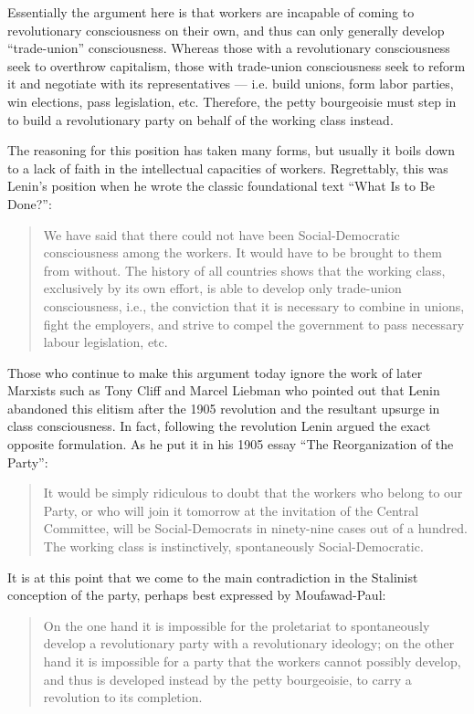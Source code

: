 Essentially the argument here is that workers are incapable of coming to revolutionary consciousness on their own, and thus can only generally develop ``trade-union'' consciousness. Whereas those with a revolutionary consciousness seek to overthrow capitalism, those with trade-union consciousness seek to reform it and negotiate with its representatives --- i.e. build unions, form labor parties, win elections, pass legislation, etc. Therefore, the petty bourgeoisie must step in to build a revolutionary party on behalf of the working class instead.

The reasoning for this position has taken many forms, but usually it boils down to a lack of faith in the intellectual capacities of workers. Regrettably, this was Lenin's position when he wrote the classic foundational text ``What Is to Be Done?'':

\blockquote{We have said that there could not have been Social-Democratic consciousness among the workers. It would have to be brought to them from without. The history of all countries shows that the working class, exclusively by its own effort, is able to develop only trade-union consciousness, i.e., the conviction that it is necessary to combine in unions, fight the employers, and strive to compel the government to pass necessary labour legislation, etc.}

Those who continue to make this argument today ignore the work of later Marxists such as Tony Cliff and Marcel Liebman who pointed out that Lenin abandoned this elitism after the 1905 revolution and the resultant upsurge in class consciousness. In fact, following the revolution Lenin argued the exact opposite formulation. As he put it in his 1905 essay ``The Reorganization of the Party'':

\blockquote{It would be simply ridiculous to doubt that the workers who belong to our Party, or who will join it tomorrow at the invitation of the Central Committee, will be Social-Democrats in ninety-nine cases out of a hundred. The working class is instinctively, spontaneously Social-Democratic.}

It is at this point that we come to the main contradiction in the Stalinist conception of the party, perhaps best expressed by Moufawad-Paul:

\blockquote{On the one hand it is impossible for the proletariat to spontaneously develop a revolutionary party with a revolutionary ideology; on the other hand it is impossible for a party that the workers cannot possibly develop, and thus is developed instead by the petty bourgeoisie, to carry a revolution to its completion.}

